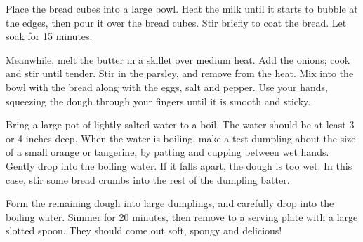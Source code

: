 
Place the bread cubes into a large bowl. Heat the milk until it starts to bubble at the edges, then pour it over the bread cubes. Stir briefly to coat the bread. Let soak for 15 minutes.

Meanwhile, melt the butter in a skillet over medium heat. Add the onions; cook and stir until tender. Stir in the parsley, and remove from the heat. Mix into the bowl with the bread along with the eggs, salt and pepper. Use your hands, squeezing the dough through your fingers until it is smooth and sticky.

Bring a large pot of lightly salted water to a boil. The water should be at least 3 or 4 inches deep. When the water is boiling, make a test dumpling about the size of a small orange or tangerine, by patting and cupping between wet hands. Gently drop into the boiling water. If it falls apart, the dough is too wet. In this case, stir some bread crumbs into the rest of the dumpling batter.

Form the remaining dough into large dumplings, and carefully drop into the boiling water. Simmer for 20 minutes, then remove to a serving plate with a large slotted spoon. They should come out soft, spongy and delicious!